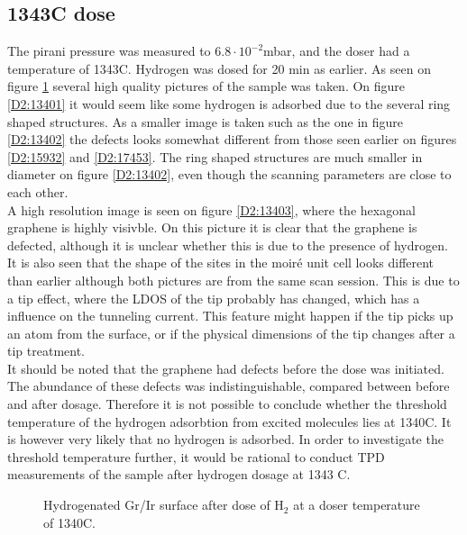 \subsection{1343\degree C dose}

The pirani pressure was measured to $6.8 \cdot 10^{-2}$mbar, and the doser had a temperature of 1343\degree C. Hydrogen was dosed for 20 min as earlier. As seen on figure \ref{D2:1340} several high quality pictures of the sample was taken. On figure \ref{D2:13401} it would seem like some hydrogen is adsorbed due to the several ring shaped structures. As a smaller image is taken such as the one in figure \ref{D2:13402} the defects looks somewhat different from those seen earlier on figures \ref{D2:15932} and \ref{D2:17453}. The ring shaped structures are much smaller in diameter on figure \ref{D2:13402}, even though the scanning parameters are close to each other.\\
A high resolution image is seen on figure \ref{D2:13403}, where the hexagonal graphene is highly visivble. On this picture it is clear that the graphene is defected, although it is unclear whether this is due to the presence of hydrogen. It is also seen that the shape of the sites in the moiré unit cell looks different than earlier although both pictures are from the same scan session. This is due to a tip effect, where the LDOS of the tip probably has changed, which has a influence on the tunneling current. This feature might happen if the tip picks up an atom from the surface, or if the physical dimensions of the tip changes after a tip treatment.\\
It should be noted that the graphene had defects before the dose was initiated. The abundance of these defects was indistinguishable, compared between before and after dosage. Therefore it is not possible to conclude whether the threshold temperature of the hydrogen adsorbtion from excited molecules lies at 1340\degree C. It is however very likely that no hydrogen is adsorbed. In order to investigate the threshold temperature further, it would be rational to conduct TPD measurements of the sample after hydrogen dosage at 1343 \degree C.

\begin{figure}[H]
\caption{Hydrogenated Gr/Ir surface after dose of H$_2$ at a doser temperature of 1340\degree C.}
\label{D2:1340}
\end{figure}



